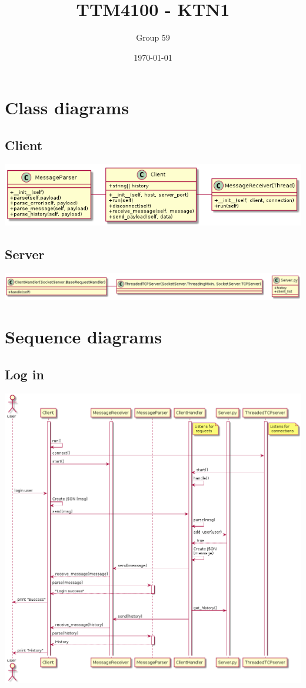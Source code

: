 \documentclass[11pt]{article}
\author{Group 59}
\date{\today}
\title{TTM4100 - KTN1}
\begin{document}
\maketitle
\tableofcontents


\section{Class diagrams}
\label{sec-1}
\subsection{Client}
\label{sec-1-1}
\includegraphics[width=.9\linewidth]{client_class.png}
\subsection{Server}
\label{sec-1-2}
\includegraphics[width=.9\linewidth]{server_class.png}

\section{Sequence diagrams}
\label{sec-2}
\subsection{Log in}
\label{sec-2-1}
\includegraphics[width=.9\linewidth]{sequence_login.png}
\end{document}
